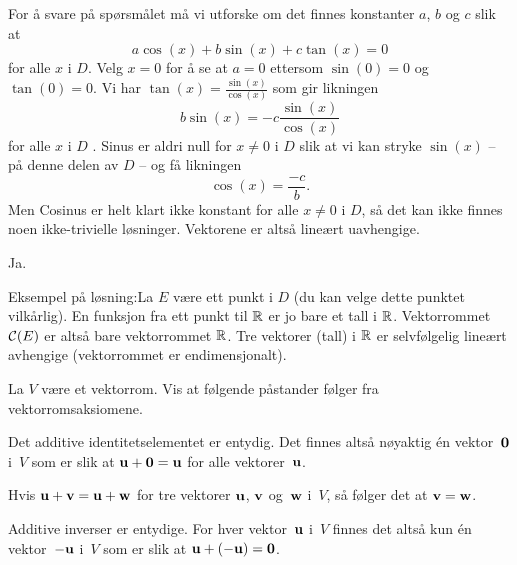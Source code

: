 \begin{losning}
\begin{punkt}
For å svare på spørsmålet må vi utforske om det finnes konstanter $a$, $b$ og $c$ slik at $$a\cos(x)+b\sin(x)+c\tan(x)=0$$ for alle $x$ i $D$. Velg $x=0$ for å se at $a=0$ ettersom $\sin(0)=0$ og $\tan(0)=0$. Vi har $\tan(x)=\frac{\sin(x)}{\cos(x)}$ som gir likningen $$b\sin(x)=-c\frac{\sin(x)}{\cos(x)}$$ for alle $x$ i $D$ . Sinus er aldri null for $x\neq 0$ i $D$ slik at vi kan stryke $\sin(x)$ -- på denne delen av $D$ -- og få likningen $$\cos(x)=\frac{-c}{b}.$$ Men Cosinus er helt klart ikke konstant for alle $x\neq 0$ i $D$, så det kan ikke finnes noen ikke-trivielle løsninger. Vektorene er altså lineært uavhengige.
\end{punkt}

\begin{punkt}
Ja. 

\noindent
Eksempel på løsning:La $E$ være ett punkt i $D$ (du kan velge dette punktet vilkårlig). En funksjon fra ett punkt til $\mathbb{R}$ er jo bare et tall i $\mathbb{R}$. Vektorrommet $\mathcal{C}(E)$ er altså bare vektorrommet $\mathbb{R}$. Tre vektorer (tall) i $\mathbb{R}$ er selvfølgelig lineært avhengige (vektorrommet er endimensjonalt).
\end{punkt}

\end{losning}


\begin{oppgave}
La $V$ være et vektorrom.
Vis at følgende påstander følger fra vektorromsaksiomene.
\begin{punkt}
Det additive identitetselementet er entydig.  Det finnes altså
nøyaktig én vektor~$\mathbf{0}$ i~$V$ som er slik at
$\mathbf{u} + \mathbf{0} = \mathbf{u}$ for alle vektorer~$\mathbf{u}$.
\end{punkt}
\begin{punkt}
Hvis $\mathbf{u} + \mathbf{v} = \mathbf{u} + \mathbf{w}$ for tre vektorer $\mathbf{u}$, $\mathbf{v}$
og~$\mathbf{w}$ i~$V$, så følger det at $\mathbf{v} = \mathbf{w}$.
\end{punkt}
\begin{punkt}
Additive inverser er entydige.  For hver vektor~$\mathbf{u}$ i~$V$ finnes
det altså kun én vektor~$-\mathbf{u}$ i~$V$ som er slik at
$\mathbf{u} + (-\mathbf{u}) = \mathbf{0}$.
\end{punkt}
\end{oppgave}

